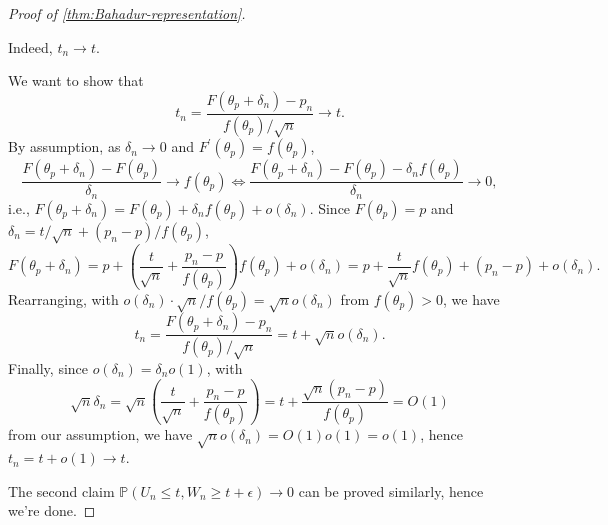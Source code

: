 \begin{proof}[Proof of \autoref{thm:Bahadur-representation}]
	\begin{claim}
		Indeed, \(t_n \to t\).
	\end{claim}
	\begin{explanation}
		We want to show that
		\[
			t_n = \frac{F(\theta _p + \delta _n) - p_n}{f(\theta _p) / \sqrt{n} } \to t.
		\]
		By assumption, as \(\delta _n \to 0\) and \(F^{\prime} (\theta _p) = f(\theta _p)\),
		\[
			\frac{F(\theta _p + \delta _n) - F(\theta _p)}{\delta _n} \to f(\theta _p)
			\iff \frac{F(\theta _p + \delta _n) - F(\theta _p) - \delta _n f(\theta _p)}{\delta _n} \to 0,
		\]
		i.e., \(F(\theta _p + \delta _n) = F(\theta _p) + \delta _n f(\theta _p) + o(\delta _n)\). Since \(F(\theta _p) = p\) and \(\delta _n = t / \sqrt{n} + (p_n - p) / f(\theta _p)\),
		\[
			F(\theta _p + \delta _n)
			= p + \left( \frac{t}{\sqrt{n}} + \frac{p_n - p}{f(\theta _p)} \right) f(\theta _p) + o(\delta _n)
			= p + \frac{t}{\sqrt{n} } f(\theta _p) + (p_n - p) + o(\delta _n).
		\]
		Rearranging, with \(o(\delta _n) \cdot \sqrt{n} / f(\theta _p) = \sqrt{n} o(\delta _n) \) from \(f(\theta _p) > 0\), we have
		\[
			t_n
			= \frac{F(\theta _p + \delta _n) - p_n}{f(\theta _p) / \sqrt{n} }
			= t + \sqrt{n} o(\delta _n).
		\]
		Finally, since \(o(\delta _n) = \delta _n o(1)\), with
		\[
			\sqrt{n} \delta _n
			= \sqrt{n} \left( \frac{t}{\sqrt{n} } + \frac{p_n - p}{f(\theta _p)} \right)
			= t + \frac{\sqrt{n} (p_n - p)}{f(\theta _p)}
			= O(1)
		\]
		from our assumption, we have \(\sqrt{n} o(\delta _n) = O(1) o(1) = o(1)\), hence \(t_n = t + o(1) \to t\).
	\end{explanation}
	The second claim \(\mathbb{P} (U_n \leq t, W_n \geq t+\epsilon ) \to 0\) can be proved similarly, hence we're done.
\end{proof}

